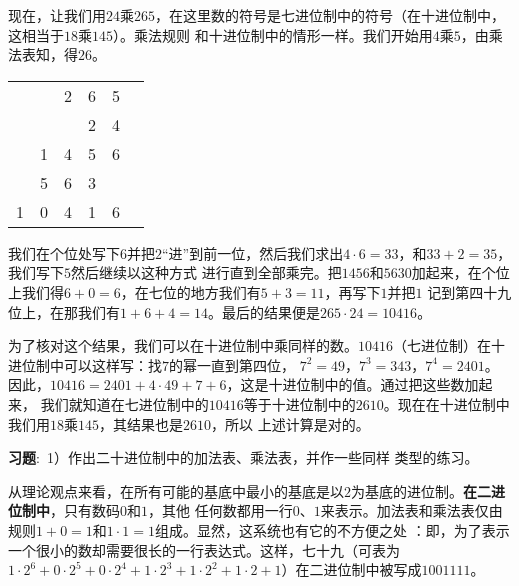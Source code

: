 现在，让我们用$24$乘$265$，在这里数的符号是七进位制中的符号（在十进位制中，这相当于$18$乘$145$）。乘法规则
和十进位制中的情形一样。我们开始用$4$乘$5$，由乘法表知，得$26$。
\begin{center}
\begin{tabular}{cccccc}
  & & 2 & 6 & 5 &  \\
    & & & 2 & 4 &  \\
    \cline{2-6}
  &1 & 4 & 5 & 6 &  \\
  &5 & 6 & 3 &   &  \\
 \hline
 1 & 0 & 4 & 1& 6&  \\
\end{tabular}
\end{center}

我们在个位处写下$6$并把$2$“进”到前一位，然后我们求出$4\cdot 6 = 33$，和$33+2=35$，我们写下$5$然后继续以这种方式
进行直到全部乘完。把$1456$和$5630$加起来，在个位上我们得$6+0=6$，在七位的地方我们有$5+3=11$，再写下$1$并把$1$
记到第四十九位上，在那我们有$1+6+4=14$。最后的结果便是$265\cdot 24 = 10416$。

为了核对这个结果，我们可以在十进位制中乘同样的数。$10416$（七进位制）在十进位制中可以这样写：找$7$的幂一直到第四位，
$7^2=49$，$7^3=343$，$7^4=2401$。因此，$10416=2401+4\cdot 49+7+6$，这是十进位制中的值。通过把这些数加起来，
我们就知道在七进位制中的$10416$等于十进位制中的$2610$。现在在十进位制中我们用$18$乘$145$，其结果也是$2610$，所以
上述计算是对的。
\begin{spacing}{2.0}
\end{spacing}
\qquad \textbf{习题}:\, {\footnotesize 1）作出二十进位制中的加法表、乘法表，并作一些同样
类型的练习。}



\begin{spacing}{2.0}
\end{spacing}
从理论观点来看，在所有可能的基底中最小的基底是以$2$为基底的进位制。\textbf{在二进位制中}，只有数码$0$和$1$，其他
任何数都用一行$0$、$1$来表示。加法表和乘法表仅由规则$1+0=1$和$1\cdot 1 = 1$组成。显然，这系统也有它的不方便之处
：即，为了表示一个很小的数却需要很长的一行表达式。这样，七十九（可表为$1\cdot 2^6 + 0\cdot 2^5 + 0\cdot 2^4 +
1\cdot 2^3 + 1\cdot 2^2 + 1\cdot 2 + 1$）在二进位制中被写成$1001111$。


